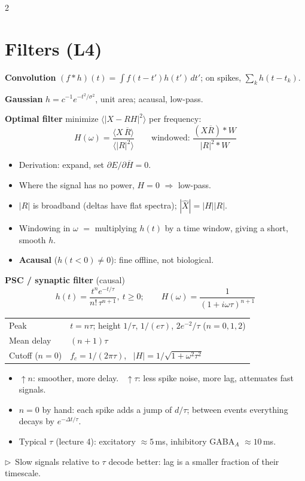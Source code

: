 \documentclass[9pt,letterpaper]{extarticle}
\newcommand{\sub}[1]{\par\vspace{2pt}\textbf{#1}\quad}
\newcommand{\tip}[1]{{\color{BrickRed}\small$\triangleright$~#1}}
\begin{document}
\begin{multicols}{2}
\section{Filters (L4)}
\sub{Convolution} $(f * h)(t) = \int f(t - t')h(t')\,dt'$; on spikes, $\sum_k h(t - t_k)$.
\sub{Gaussian} $h = c^{-1}e^{-t^2/\sigma^2}$, unit area; acausal, low-pass.
\sub{Optimal filter} minimize $\langle|X - RH|^2\rangle$ per frequency:
\[
\boxed{H(\omega) = \frac{\langle X\,\overline{R}\rangle}{\langle |R|^2\rangle}}\qquad \text{windowed: } \frac{(X\overline R) * W}{|R|^2 * W}
\]
\begin{itemize}
\item Derivation: expand, set $\partial E/\partial\overline H = 0$.
\item Where the signal has no power, $H = 0$ $\Rightarrow$ low-pass.
\item $|R|$ is broadband (deltas have flat spectra); $|\hat X| = |H||R|$.
\item Windowing in $\omega$ $=$ multiplying $h(t)$ by a time window, giving a short, smooth $h$.
\item \textbf{Acausal} ($h(t<0) \ne 0$): fine offline, not biological.
\end{itemize}
\sub{PSC / synaptic filter} (causal)
\[
h(t) = \frac{t^n e^{-t/\tau}}{n!\,\tau^{n+1}},\ t \ge 0;\qquad H(\omega) = \frac{1}{(1 + i\omega\tau)^{n+1}}
\]
\begin{tabular}{@{}ll@{}}
Peak & $t = n\tau$; height $1/\tau$, $1/(e\tau)$, $2e^{-2}/\tau$ ($n = 0, 1, 2$)\\
Mean delay & $(n+1)\tau$\\
Cutoff ($n=0$) & $f_c = 1/(2\pi\tau)$, \ $|H| = 1/\sqrt{1 + \omega^2\tau^2}$\\
\end{tabular}
\begin{itemize}
\item $\uparrow n$: smoother, more delay. \ $\uparrow\tau$: less spike noise, more lag, attenuates fast signals.
\item $n = 0$ by hand: each spike adds a jump of $d/\tau$; between events everything decays by $e^{-\Delta t/\tau}$.
\item Typical $\tau$ (lecture 4): excitatory $\approx 5$\,ms, inhibitory GABA$_A$ $\approx 10$\,ms.
\end{itemize}
\tip{Slow signals relative to $\tau$ decode better: lag is a smaller fraction of their timescale.}


\end{multicols}
\end{document}
